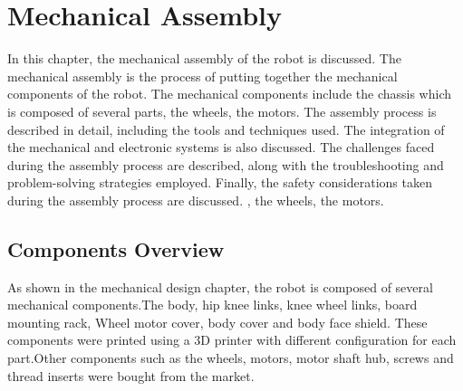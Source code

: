 \chapter{Mechanical Assembly}

\graphicspath{{./Figures/Mechanical Assembly/}}

In this chapter, the mechanical assembly of the robot is discussed.
The mechanical assembly is the process of putting together the mechanical components of the robot.
The mechanical components include the chassis which is composed of several parts, the wheels, the motors.
The assembly process is described in detail, including the tools and techniques used.
The integration of the mechanical and electronic systems is also discussed.
The challenges faced during the assembly process are described, along with the troubleshooting and problem-solving strategies employed.
Finally, the safety considerations taken during the assembly process are discussed.
, the wheels, the motors.
\newpage

\section{Components Overview}

As shown in the mechanical design chapter, the robot is composed of several mechanical components.The body, hip knee links, knee wheel links, board mounting rack, Wheel motor cover, body cover and body face shield.
These components were printed using a 3D printer with different configuration for each part.Other components such as the wheels, motors, motor shaft hub, screws and thread inserts were bought from the market.
